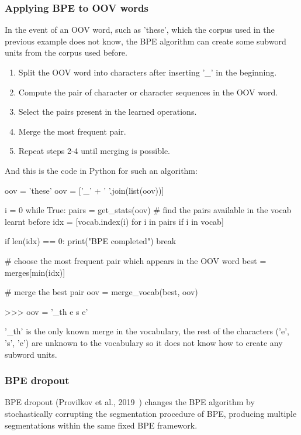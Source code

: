 \subsubsection{Applying BPE to OOV words}

In the event of an OOV word, such as 'these', which the corpus used in the previous example does not know, the BPE algorithm can create some subword units from the corpus used before.

\begin{enumerate}
    \item Split the OOV word into characters after inserting '\_' in the beginning.
    \item Compute the pair of character or character sequences in the OOV word.
    \item Select the pairs present in the learned operations.
    \item Merge the most frequent pair.
    \item Repeat steps 2-4 until merging is possible.
\end{enumerate}

And this is the code in Python for such an algorithm:

\begin{python}
oov = 'these'
oov = ['_' + ' '.join(list(oov))]

i = 0
while True:
  pairs = get_stats(oov)
  # find the pairs available in the vocab learnt before
  idx = [vocab.index(i) for i in pairs if i in vocab]

  if len(idx) == 0:
    print("BPE completed")
    break

  # choose the most frequent pair which appears in the OOV word
  best = merges[min(idx)]

  # merge the best pair
  oov = merge_vocab(best, oov)

>>> oov = '_th e s e'
\end{python}

'\_th' is the only known merge in the vocabulary, the rest of the characters ('e', 's', 'e') are unknown to the vocabulary so it does not know how to create any subword units.

\subsubsection{BPE dropout}

BPE dropout (Provilkov et al., 2019~\cite{provilkov2019bpedropout}) changes the BPE algorithm by stochastically corrupting the segmentation procedure of BPE, producing multiple segmentations within the same fixed BPE framework.

